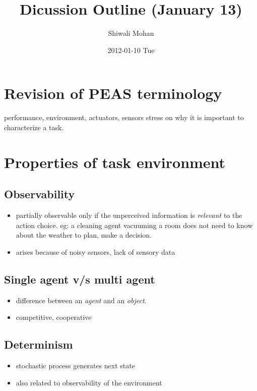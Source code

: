 \documentclass[11pt]{article}
\title{Dicussion Outline (January 13)}
\author{Shiwali Mohan}
\date{2012-01-10 Tue}
\begin{document}
\maketitle



\section{Revision of PEAS terminology}
\label{sec-1}

performance, environment, actuators, sensors
stress on why it is important to characterize a task.
\section{Properties of task environment}
\label{sec-2}
\subsection{Observability}
\label{sec-2-1}

\begin{itemize}
\item partially observable only if the unperceived information is
  \emph{relevant} to the action choice. eg: a cleaning agent vacuuming a
  room does not need to know about the weather to plan, make a decision.
\item arises because of noisy sensors, lack of sensory data
\end{itemize}
\subsection{Single agent v/s multi agent}
\label{sec-2-2}

\begin{itemize}
\item difference between an \emph{agent} and an \emph{object}.
\item competitive, cooperative
\end{itemize}
\subsection{Determinism}
\label{sec-2-3}

\begin{itemize}
\item stochastic process generates next state
\item also related to observability of the environment
\end{itemize}
\end{document}
